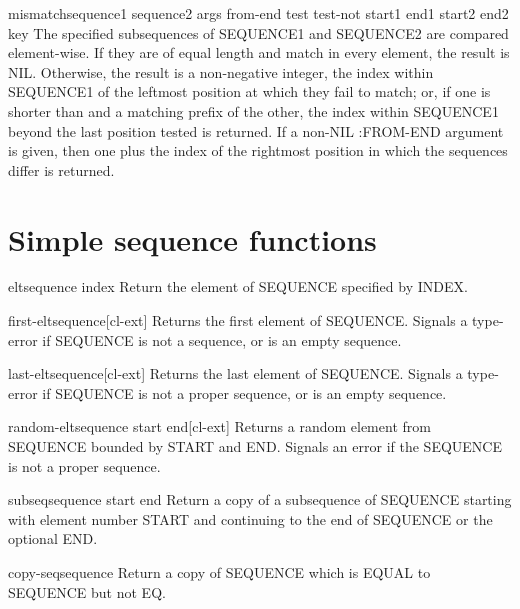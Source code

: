 \documentclass[10pt,english]{book}
\begin{document}
\begin{function}{mismatch}{sequence1 sequence2 \rest args \key from-end test test-not start1 end1 start2
    end2 key}
  The specified subsequences of SEQUENCE1 and SEQUENCE2 are compared
  element-wise. If they are of equal length and match in every element, the
  result is NIL. Otherwise, the result is a non-negative integer, the index
  within SEQUENCE1 of the leftmost position at which they fail to match; or,
  if one is shorter than and a matching prefix of the other, the index within
  SEQUENCE1 beyond the last position tested is returned. If a non-NIL
  :FROM-END argument is given, then one plus the index of the rightmost
  position in which the sequences differ is returned.
\end{function}

\section{Simple sequence functions}
\label{sec:simple-sequ-funct}

\begin{accessor}{elt}{sequence index}
  Return the element of SEQUENCE specified by INDEX.
\end{accessor}

\begin{function}{first-elt}{sequence}[cl-ext]
  Returns the first element of SEQUENCE. Signals a type-error if SEQUENCE is
  not a sequence, or is an empty sequence.
\end{function}

\begin{function}{last-elt}{sequence}[cl-ext]
  Returns the last element of SEQUENCE. Signals a type-error if SEQUENCE is
  not a proper sequence, or is an empty sequence.
\end{function}

\begin{function}{random-elt}{sequence \key start end}[cl-ext]
  Returns a random element from SEQUENCE bounded by START and END.
  Signals an error if the SEQUENCE is not a proper sequence.
\end{function}

\begin{accessor}{subseq}{sequence start \op end}
  Return a copy of a subsequence of SEQUENCE starting with element number
  START and continuing to the end of SEQUENCE or the optional END.
\end{accessor}

\begin{function}{copy-seq}{sequence}
  Return a copy of SEQUENCE which is EQUAL to SEQUENCE but not EQ.
\end{function}
\end{document}
